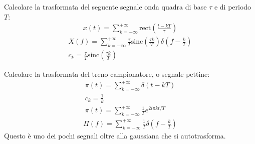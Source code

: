\documentclass{article}
\begin{document}
Calcolare la trasformata del seguente segnale onda quadra di base $\tau$ e di periodo $T$:
\begin{gather*}
    x(t)=\displaystyle\sum_{k=-\infty}^{+\infty}\mbox{rect}\left(\frac{t-kT}{\tau}\right)
\end{gather*}
\begin{gather}
    X(f)=\displaystyle\sum_{k=-\infty}^{+\infty}\frac{\tau}{T}\mbox{sinc}\left(\frac{\tau k}{T}\right)\delta\left(f-\frac{k}{T}\right)\\
    c_k=\displaystyle\frac{\tau}{T}\mbox{sinc}\left(\frac{\tau k}{T}\right)
\end{gather}

Calcolare la trasformata del treno campionatore, o segnale pettine:
\begin{gather*}
    \pi(t)=\displaystyle\sum_{k=-\infty}^{+\infty}\delta(t-kT)\\
    c_k=\displaystyle\frac{1}{k}\\
    \pi(t)=\displaystyle\sum_{k=-\infty}^{+\infty}\frac{1}{T}e^{2i\pi kt/T}
\end{gather*}
\begin{gather}
    \Pi(f)=\displaystyle\sum_{k=-\infty}^{+\infty}\frac{1}{T}\delta\left(f-\frac{k}{T}\right)
\end{gather}
Questo è uno dei pochi segnali oltre alla gaussiana che si autotrasforma. 
\end{document}
